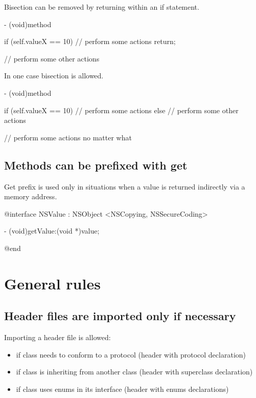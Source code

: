 \documentclass[10pt]{extarticle}
\newenvironment{codelisting}
{\footnotesize\mdframed[middlelinewidth=0.5pt, middlelinecolor=BaliHaiColor, skipabove=15pt]\verbatim}
{\endverbatim\endmdframed\vspace{12pt}\normalsize}
\begin{document}
Bisection can be removed by returning within an if statement.

\begin{codelisting}
- (void)method
{
    if (self.valueX == 10) {
        // perform some actions
        return;
    }
    
    // perform some other actions
}
\end{codelisting}

In one case bisection is allowed.

\begin{codelisting}
- (void)method
{
    if (self.valueX == 10) {
        // perform some actions
    }
    else {
        // perform some other actions
    }
    
    // perform some actions no matter what
}
\end{codelisting}


\subsection{Methods can be prefixed with get}

Get prefix is used only in situations when a value is returned indirectly via a memory address.

\begin{codelisting}
@interface NSValue : NSObject <NSCopying, NSSecureCoding>

- (void)getValue:(void *)value;

@end
\end{codelisting}


\section{General rules}

\subsection{Header files are imported only if necessary}

Importing a header file is allowed:

\begin{itemize}
\item if class needs to conform to a protocol (header with protocol declaration)
\item if class is inheriting from another class (header with superclass declaration)
\item if class uses enums in its interface (header with enums declarations)
\end{itemize}
\end{document}
